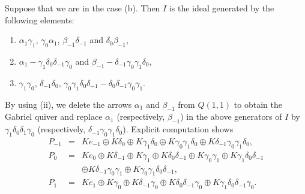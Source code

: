 \documentclass[12pt]{amsart}
\numberwithin{equation}{thm}
\begin{document}
Suppose that we are in the case (b). Then $I$ is the ideal generated by the following elements:
\begin{enumerate}
\item  $\alpha_1\gamma_1$, $\gamma_0\alpha_1$, $\beta_{-1}\delta_{-1}$ and $\delta_0\beta_{-1}$, 
\item $\alpha_{1}-\gamma_{1}\delta_{0}\delta_{-1}\gamma_{0}$ and $\beta_{-1}-\delta_{-1}\gamma_0\gamma_1\delta_0$,
\item $\gamma_{1}\gamma_{0}$, $\delta_{-1}\delta_{0}$, $\gamma_{0}\gamma_{1}\delta_{0}\delta_{-1}-\delta_{0}\delta_{-1}\gamma_{0}\gamma_{1}$.
\end{enumerate}
By using (ii), we delete the arrows $\alpha_{1}$ and $\beta_{-1}$ from $Q(1,1)$ to obtain the Gabriel quiver  
and replace $\alpha_1$ (respectively, $\beta_{-1}$) in the above generators of $I$ 
by $\gamma_{1}\delta_{0}\delta_{1}\gamma_{0}$ (respectively, $\delta_{-1}\gamma_0\gamma_1\delta_0$). 
Explicit computation shows 
\[\begin{array}{lcl}
P_{-1} &=&Ke_{-1}\oplus K\delta_{0}\oplus K\gamma_1\delta_{0} \oplus K\gamma_0\gamma_{1}\delta_{0}\oplus K\delta_{-1}\gamma_{0}\gamma_{1}\delta_{0}, \\
P_{0} &=& Ke_0\oplus K\delta_{-1}\oplus K\gamma_{1} \oplus K\delta_{0}\delta_{-1} \oplus K\gamma_{0}\gamma_{1}\oplus K\gamma_{1}\delta_{0}\delta_{-1} \\
        & & \oplus K\delta_{-1}\gamma_{0}\gamma_{1}\oplus K\gamma_0\gamma_1\delta_0\delta_{-1}, \\
P_1  &=& Ke_1\oplus K\gamma_0\oplus K\delta_{-1}\gamma_0\oplus K\delta_{0}\delta_{-1}\gamma_0\oplus K\gamma_{1}\delta_0\delta_{-1}\gamma_{0}. \\   
\end{array} \]
\end{document}
